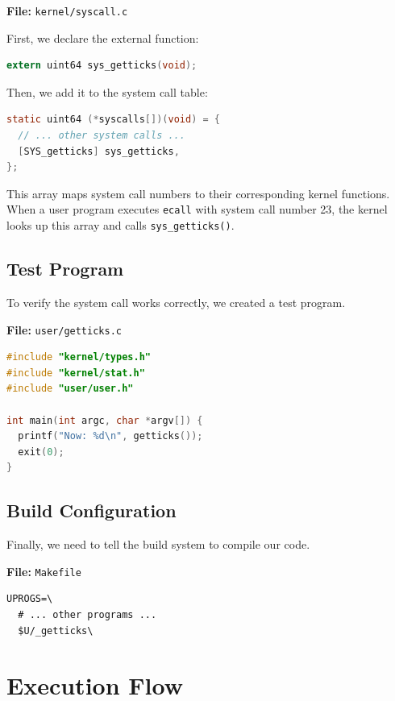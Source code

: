 \documentclass[a4paper]{article}
\begin{document}
\textbf{File:} \texttt{kernel/syscall.c}

First, we declare the external function:

\begin{lstlisting}[style=code, language=C]
extern uint64 sys_getticks(void);
\end{lstlisting}

Then, we add it to the system call table:

\begin{lstlisting}[style=code, language=C]
static uint64 (*syscalls[])(void) = {
  // ... other system calls ...
  [SYS_getticks] sys_getticks,
};
\end{lstlisting}

This array maps system call numbers to their corresponding kernel functions. When a user program executes \texttt{ecall} with system call number 23, the kernel looks up this array and calls \texttt{sys\_getticks()}.

\subsection{Test Program}

To verify the system call works correctly, we created a test program.

\textbf{File:} \texttt{user/getticks.c}

\begin{lstlisting}[style=code, language=C]
#include "kernel/types.h"
#include "kernel/stat.h"
#include "user/user.h"

int main(int argc, char *argv[]) {
  printf("Now: %d\n", getticks());
  exit(0);
}
\end{lstlisting}

\subsection{Build Configuration}

Finally, we need to tell the build system to compile our code.

\textbf{File:} \texttt{Makefile}

\begin{lstlisting}[style=code]
UPROGS=\
  # ... other programs ...
  $U/_getticks\
\end{lstlisting}

\section{Execution Flow}
\end{document}
